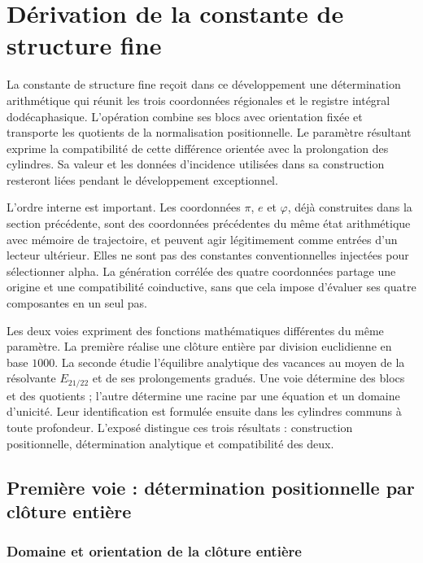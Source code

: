 \section{Dérivation de la constante de structure fine}
\label{sec:alpha}

La constante de structure fine reçoit dans ce développement une détermination arithmétique qui réunit les trois coordonnées régionales et le registre intégral dodécaphasique. L'opération combine ses blocs avec orientation fixée et transporte les quotients de la normalisation positionnelle. Le paramètre résultant exprime la compatibilité de cette différence orientée avec la prolongation des cylindres. Sa valeur et les données d'incidence utilisées dans sa construction resteront liées pendant le développement exceptionnel.

L'ordre interne est important. Les coordonnées \(\pi\), \(e\) et \(\varphi\), déjà construites dans la section précédente, sont des coordonnées
précédentes du même état arithmétique avec mémoire de trajectoire, et peuvent agir légitimement comme
entrées d'un lecteur ultérieur. Elles ne sont pas des constantes conventionnelles
injectées pour sélectionner alpha. La génération corrélée des quatre coordonnées partage une origine et
une compatibilité coinductive, sans que cela impose d'évaluer ses quatre
composantes en un seul pas.

Les deux voies expriment des fonctions mathématiques différentes du même paramètre.
La première réalise une clôture entière par division euclidienne en base
\(1000\). La seconde étudie l’équilibre analytique des vacances au moyen
de la résolvante \(E_{21/22}\) et de ses prolongements gradués. Une voie
détermine des blocs et des quotients ; l’autre détermine une racine par une
équation et un domaine d’unicité. Leur identification est formulée ensuite
dans les cylindres communs à toute profondeur. L’exposé distingue
ces trois résultats : construction positionnelle, détermination analytique
et compatibilité des deux.

\subsection{Première voie : détermination positionnelle par clôture entière}
\subsubsection{Domaine et orientation de la clôture entière}
\label{subsec:alpha-dominio}

